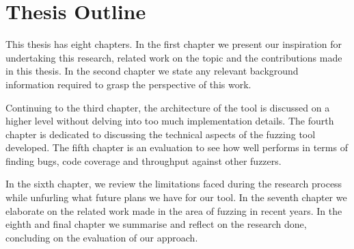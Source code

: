 \section{Thesis Outline}
This thesis has eight chapters. In the first chapter we present our inspiration for undertaking this research, related work on the topic and the contributions made in this thesis. In the second chapter we state any relevant background information required to grasp the perspective of this work. 

Continuing to the third chapter, the architecture of the tool is discussed on a higher level without delving into too much implementation details. The fourth chapter is dedicated to discussing the technical aspects of the fuzzing tool developed. The fifth chapter is an evaluation to see how well \pname{} performs in terms of finding bugs, code coverage and throughput against other fuzzers. 

In the sixth chapter, we review the limitations faced during the research process while unfurling what future plans we have for our tool. In the seventh chapter we elaborate on the related work made in the area of fuzzing in recent years. In the eighth and final chapter we summarise and reflect on the research done, concluding on the evaluation of our approach.